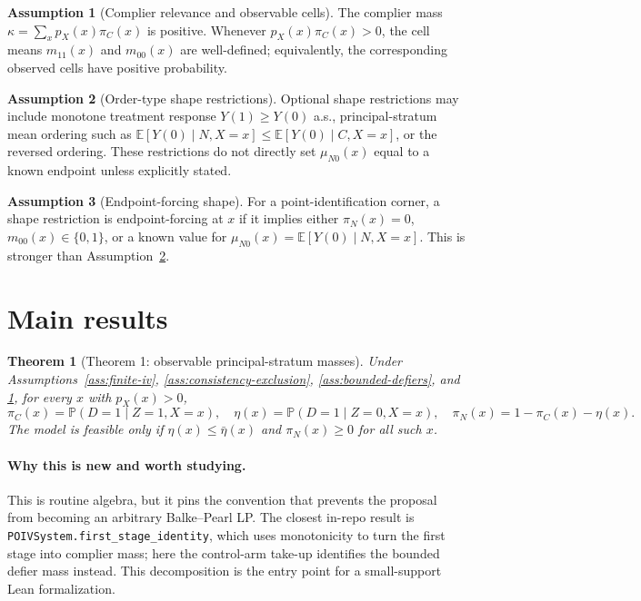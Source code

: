 \documentclass[11pt]{article}
\newcommand{\E}{\mathbb{E}}
\renewcommand{\Pr}{\mathbb{P}}
\theoremstyle{definition}
\newtheorem{assumption}{Assumption}
\theoremstyle{plain}
\newtheorem{theorem}{Theorem}
\theoremstyle{remark}
\begin{document}
\begin{assumption}[Complier relevance and observable cells]\label{ass:relevance}
The complier mass \(\kappa=\sum_x p_X(x)\pi_C(x)\) is positive.  Whenever \(p_X(x)\pi_C(x)>0\), the cell means \(m_{11}(x)\) and \(m_{00}(x)\) are well-defined; equivalently, the corresponding observed cells have positive probability.
\end{assumption}

\begin{assumption}[Order-type shape restrictions]\label{ass:order-shape}
Optional shape restrictions may include monotone treatment response \(Y(1)\ge Y(0)\) a.s., principal-stratum mean ordering such as \(\E[Y(0)\mid N,X=x]\le\E[Y(0)\mid C,X=x]\), or the reversed ordering.  These restrictions do not directly set \(\mu_{N0}(x)\) equal to a known endpoint unless explicitly stated.
\end{assumption}

\begin{assumption}[Endpoint-forcing shape]\label{ass:endpoint-shape}
For a point-identification corner, a shape restriction is endpoint-forcing at \(x\) if it implies either \(\pi_N(x)=0\), \(m_{00}(x)\in\{0,1\}\), or a known value for \(\mu_{N0}(x)=\E[Y(0)\mid N,X=x]\).  This is stronger than Assumption~\ref{ass:order-shape}.
\end{assumption}

\section{Main results}
\begin{theorem}[Theorem 1: observable principal-stratum masses]\label{thm:observable-masses}
Under Assumptions~\ref{ass:finite-iv}, \ref{ass:consistency-exclusion}, \ref{ass:bounded-defiers}, and \ref{ass:relevance}, for every \(x\) with \(p_X(x)>0\),
\[
\pi_C(x)=\Pr(D=1\mid Z=1,X=x),\quad
\eta(x)=\Pr(D=1\mid Z=0,X=x),\quad
\pi_N(x)=1-\pi_C(x)-\eta(x).
\]
The model is feasible only if \(\eta(x)\le \bar\eta(x)\) and \(\pi_N(x)\ge0\) for all such \(x\).
\end{theorem}
\paragraph{Why this is new and worth studying.}
This is routine algebra, but it pins the convention that prevents the proposal from becoming an arbitrary Balke--Pearl LP.  The closest in-repo result is \texttt{POIVSystem.first\_stage\_identity}, which uses monotonicity to turn the first stage into complier mass; here the control-arm take-up identifies the bounded defier mass instead.  This decomposition is the entry point for a small-support Lean formalization.
\end{document}
